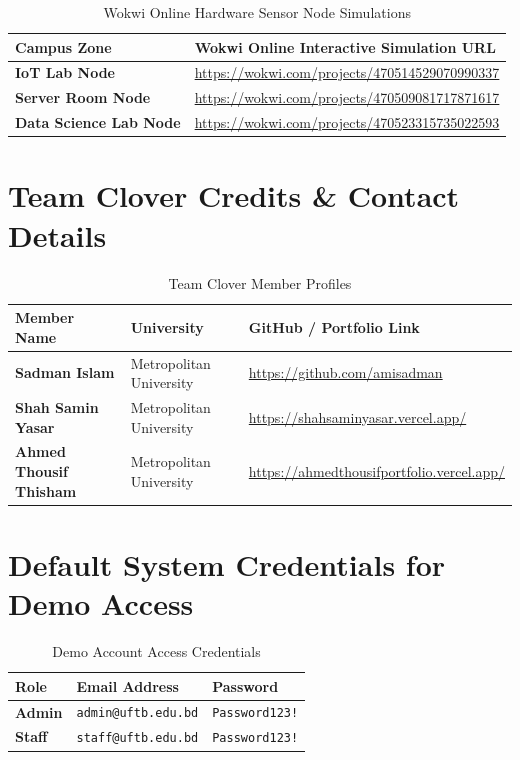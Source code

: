 \documentclass[11pt,a4paper]{article}
\begin{document}
\begin{table}[h!]
\centering
\renewcommand{\arraystretch}{1.6}
\begin{tabularx}{\textwidth}{l X}
\toprule
\textbf{Campus Zone} & \textbf{Wokwi Online Interactive Simulation URL} \\
\midrule
\textbf{IoT Lab Node} & \url{https://wokwi.com/projects/470514529070990337} \\
\textbf{Server Room Node} & \url{https://wokwi.com/projects/470509081717871617} \\
\textbf{Data Science Lab Node} & \url{https://wokwi.com/projects/470523315735022593} \\
\bottomrule
\end{tabularx}
\caption{Wokwi Online Hardware Sensor Node Simulations}
\end{table}

\vspace{0.5cm}

\section{Team Clover Credits \& Contact Details}

\begin{table}[h!]
\centering
\renewcommand{\arraystretch}{1.5}
\begin{tabularx}{\textwidth}{l l X}
\toprule
\textbf{Member Name} & \textbf{University} & \textbf{GitHub / Portfolio Link} \\
\midrule
\textbf{Sadman Islam} & Metropolitan University & \url{https://github.com/amisadman} \\
\textbf{Shah Samin Yasar} & Metropolitan University & \url{https://shahsaminyasar.vercel.app/} \\
\textbf{Ahmed Thousif Thisham} & Metropolitan University & \url{https://ahmedthousifportfolio.vercel.app/} \\
\bottomrule
\end{tabularx}
\caption{Team Clover Member Profiles}
\end{table}

\vspace{0.5cm}

\section{Default System Credentials for Demo Access}

\begin{table}[h!]
\centering
\renewcommand{\arraystretch}{1.5}
\begin{tabularx}{\textwidth}{l l l}
\toprule
\textbf{Role} & \textbf{Email Address} & \textbf{Password} \\
\midrule
\textbf{Admin} & \texttt{admin@uftb.edu.bd} & \texttt{Password123!} \\
\textbf{Staff} & \texttt{staff@uftb.edu.bd} & \texttt{Password123!} \\
\bottomrule
\end{tabularx}
\caption{Demo Account Access Credentials}
\end{table}
\end{document}
